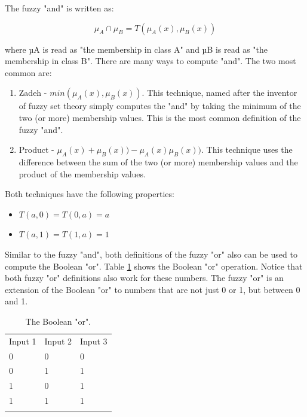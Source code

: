 The fuzzy "and" is written as: 

\begin{equation}\label{eq:prediction}
\displaystyle \mu_A\cap \mu_B = T(\mu_A(x),\mu_ B(x))  
\end{equation}

where µA is read as "the membership in class A" and µB is read as "the
membership in class B". There are many ways to compute "and". The two most
common are: 

\begin{enumerate}
\item Zadeh - $min(\mu_A(x), \mu_B(x))$.  This technique, named after the
inventor of fuzzy set theory simply computes the "and" by taking the minimum of
the two (or more) membership values. This is the most common definition of the
fuzzy "and". 
\item Product - $\mu_A(x) + \mu_B(x)) - \mu_A(x) \mu_B(x))$.  This technique uses the
difference between the sum of the two (or more) membership values and the
product of the membership values.
\end{enumerate}

Both techniques have the following properties:
\begin{itemize}
\item $T(a,0) = T(0,a) = a$ 
\item $T(a,1) = T(1,a) = 1$
\end{itemize} 
Similar to the fuzzy "and", both
definitions of the fuzzy "or" also can be used to compute the Boolean "or".
Table \ref{tab:boolean_or} shows the Boolean "or" operation. Notice that both fuzzy "or" definitions
also work for these numbers. The fuzzy "or" is an extension of the Boolean "or"
to numbers that are not just 0 or 1, but between 0 and 1.

\begin{table}
\small
\caption{The Boolean "or".}
\label{tab:boolean_or} 
\centering
\small
\begin{tabular}{p{3cm} p{3cm} p{3cm} }
\hline\noalign{\smallskip}
 Input 1 & Input 2 & Input 3 \\
\noalign{\smallskip}\hline\noalign{\smallskip}
\small{0} & \small{0} & \small{0}\\ \hline  
\small{0} & \small{1} & \small{1}\\ \hline  
\small{1} & \small{0} & \small{1}\\ \hline  
\small{1} & \small{1} & \small{1}\\ \hline  
\noalign{\smallskip}\hline
\end{tabular}
\end{table}

